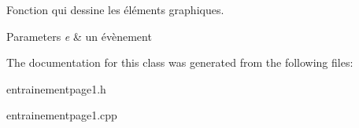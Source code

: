 Fonction qui dessine les éléments graphiques. 


\begin{DoxyParams}{Parameters}
{\em e} & un évènement \\
\hline
\end{DoxyParams}


The documentation for this class was generated from the following files\-:\begin{DoxyCompactItemize}
\item 
entrainementpage1.\-h\item 
entrainementpage1.\-cpp\end{DoxyCompactItemize}
